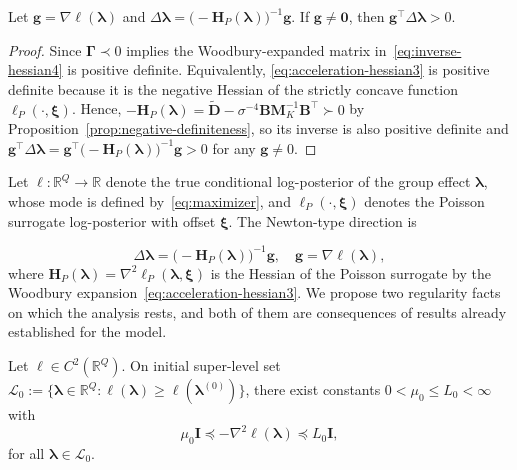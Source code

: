\begin{lemma}
    Let $\mathbf{g}=\nabla \ell(\bm{\lambda})$ and $\Delta \bm{\lambda}=\bigl(-\mathbf{H}_{P}(\bm{\lambda})\bigr)^{-1}\mathbf{g}$. If $\mathbf{g}\neq \bm{0}$, then $\mathbf{g}^{\top}\Delta \bm{\lambda}>0$.
\end{lemma}

\begin{proof}
    Since $\bm{\Gamma}\prec 0$ implies the Woodbury-expanded matrix in~\eqref{eq:inverse-hessian4} is positive definite. Equivalently, \eqref{eq:acceleration-hessian3} is positive definite because it is the negative Hessian of the strictly concave function $\ell_{P}(\cdot, \bm{\xi})$. Hence, $-\mathbf{H}_{P}(\bm{\lambda})=\tilde{\mathbf{D}}-\sigma^{-4}\mathbf{BM}_{K}^{-1}\mathbf{B}^{\top}\succ 0$ by Proposition~\ref{prop:negative-definiteness}, so its inverse is also positive definite and $\mathbf{g}^{\top}\Delta\bm{\lambda}=\mathbf{g}^{\top}\bigl(-\mathbf{H}_{P}(\bm{\lambda})\bigr)^{-1}\mathbf{g}>0$ for any $\mathbf{g}\neq 0$.
\end{proof}

Let $\ell: \mathbb{R}^{Q}\to \mathbb{R}$ denote the true conditional log-posterior of the group effect $\bm{\lambda}$, whose mode is defined by~\eqref{eq:maximizer}, and $\ell_{P}(\cdot,\bm{\xi})$ denotes the Poisson surrogate log-posterior with offset $\bm{\xi}$. The Newton-type direction is 

\begin{equation}
    \Delta \bm{\lambda}=\bigl(-\mathbf{H}_{P}(\bm{\lambda})\bigr)^{-1}\mathbf{g}, \quad \mathbf{g}=\nabla\ell(\bm{\lambda}),
    \label{eq:newton-type-direction}
\end{equation}
where $\mathbf{H}_{P}(\bm{\lambda})=\nabla^{2}\ell_{P}(\bm{\lambda},\bm{\xi})$ is the Hessian of the Poisson surrogate by the Woodbury expansion~\eqref{eq:acceleration-hessian3}. We propose two regularity facts on which the analysis rests, and both of them are consequences of results already established for the model.

\begin{assumption}
    Let $\ell\in C^{2}(\mathbb{R}^{Q})$. On initial super-level set $\mathcal{L}_{0}:=\{\bm{\lambda}\in\mathbb{R}^{Q}:\ell(\bm{\lambda})\geq \ell(\bm{\lambda}^{(0)})\}$, there exist constants $0<\mu_{0}\leq L_{0}<\infty$ with
    \begin{equation}
        \mu_{0}\mathbf{I}\preceq -\nabla^{2}\ell(\bm{\lambda})\preceq L_{0}\mathbf{I},
    \end{equation}
    for all $\bm{\lambda}\in\mathcal{L}_{0}$.
    \label{as:ell}
\end{assumption}


